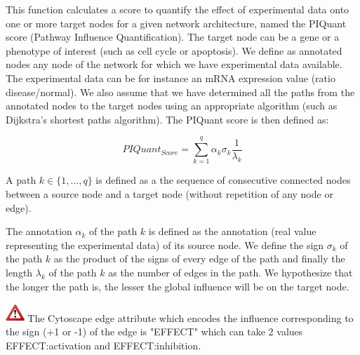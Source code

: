 
This function calculates a score to quantify the effect of experimental data
onto one or more target nodes for a given network architecture, named the
PIQuant score (Pathway Influence Quantification). The target node can be a gene
or a phenotype of interest (such as cell cycle or apoptosis). We define as
annotated nodes any node of the network for which we have experimental data
available. The experimental data can be for instance an mRNA expression value
(ratio disease/normal). We also assume that we have determined all the paths
from the annotated nodes to the target nodes using an appropriate algorithm
(such as Dijkstra's shortest paths algorithm). The PIQuant score is then defined as:


$$
 PIQuant_{Score} = \sum_{k=1}^{q} \alpha_{k} \sigma_{k} \frac{1}{\lambda_{k}}
$$

 A path $k \in \{1,\ldots , q\}$ is defined
as a the sequence of consecutive connected nodes
between a source node and a target node (without repetition of any node
or edge).

The annotation $\alpha_k$ of the path $k$ is defined as the annotation (real value representing the experimental data) 
of its source node. We define the sign $\sigma_k$
of the path $k$ as the product of the signs of every edge of the path and finally
the length $\lambda_k$ of the path $k$ as the number of edges in the path. We
hypothesize that the longer the path is, the lesser the global influence will be
on the target node.

\includegraphics[width=20pt,height=20pt]{graphics/warning} The Cytoscape edge attribute
which encodes the influence corresponding to the sign (+1 or -1) of the edge is "EFFECT" which can take 2 values EFFECT:activation and
EFFECT:inhibition.\\\\

